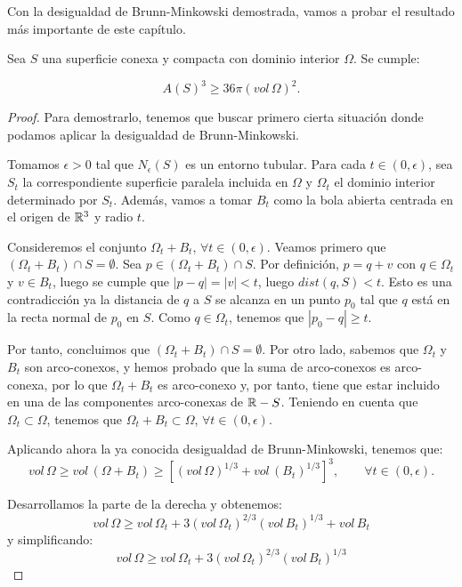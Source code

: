Con la desigualdad de Brunn-Minkowski demostrada, vamos a probar el resultado más importante de este capítulo.
\begin{theorem}
Sea $S$ una superficie conexa y compacta con dominio interior $\Omega$. Se cumple:

\begin{equation*}
    A(S)^3 \geq 36\pi(vol \, \Omega)^2.
\end{equation*}
\end{theorem}
\begin{proof}
Para demostrarlo, tenemos que buscar primero cierta situación donde podamos aplicar la desigualdad de Brunn-Minkowski.

Tomamos $\epsilon > 0$ tal que $N_\epsilon(S)$ es un entorno tubular. Para cada $t \in (0, \epsilon)$, sea $S_t$ la correspondiente superficie paralela incluida en $\Omega$ y $\Omega_t$ el dominio interior determinado por $S_t$. Además, vamos a tomar $B_t$ como la bola abierta centrada en el origen de $\mathbb{R}^3$ y radio $t$.

Consideremos el conjunto $\Omega_t + B_t$, $\forall t \in (0, \epsilon)$. Veamos primero que $(\Omega_t + B_t) \cap S = \emptyset$. Sea $p \in (\Omega_t + B_t) \cap S$. Por definición, $p = q + v$ con $q \in \Omega_t$ y $v \in B_t$, luego se cumple que $|p - q| = |v| < t$, luego $dist(q, S) < t$. Esto es una contradicción ya la distancia de $q$ a $S$ se alcanza en un punto $p_0$ tal que $q$ está en la recta normal de $p_0$ en $S$. Como $q \in \Omega_t$, tenemos que $|p_0 - q| \geq t$.

Por tanto, concluimos que $(\Omega_t + B_t) \cap S = \emptyset$. Por otro lado, sabemos que $\Omega_t$ y $B_t$ son arco-conexos, y hemos probado que la suma de arco-conexos es arco-conexa, por lo que $\Omega_t + B_t$ es arco-conexo y, por tanto, tiene que estar incluido en una de las componentes arco-conexas de $\mathbb{R} - S$. Teniendo en cuenta que $\Omega_t \subset \Omega$, tenemos que $\Omega_t + B_t \subset \Omega$, $\forall t \in (0, \epsilon)$.

Aplicando ahora la ya conocida desigualdad de Brunn-Minkowski, tenemos que:
%
\begin{equation*}
    vol \, \Omega \geq vol \, (\Omega + B_t) \geq \left[ (vol \, \Omega)^{1/3} + vol \, (B_t)^{1/3} \right]^3, \qquad \forall t \in (0, \epsilon).
\end{equation*}

Desarrollamos la parte de la derecha y obtenemos:
%
\begin{equation*}
    vol \, \Omega \geq vol \, \Omega_t + 3(vol \, \Omega_t)^{2/3}(vol \, B_t)^{1/3} + vol \, B_t
\end{equation*}
%
y simplificando:
%
\begin{equation*}
    vol \, \Omega \geq vol \, \Omega_t + 3(vol \, \Omega_t)^{2/3}(vol \, B_t)^{1/3}
\end{equation*}


\end{proof}
